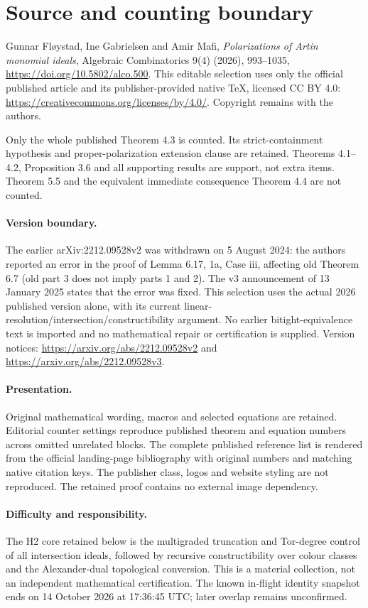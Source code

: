 \section*{Source and counting boundary}
Gunnar Fløystad, Ine Gabrielsen and Amir Mafi, \emph{Polarizations of Artin monomial ideals}, Algebraic Combinatorics 9(4) (2026), 993--1035, \url{https://doi.org/10.5802/alco.500}.
This editable selection uses only the official published article and its publisher-provided native TeX, licensed CC BY 4.0: \url{https://creativecommons.org/licenses/by/4.0/}. Copyright remains with the authors.

Only the whole published Theorem 4.3 is counted. Its strict-containment hypothesis and proper-polarization extension clause are retained. Theorems 4.1--4.2, Proposition 3.6 and all supporting results are support, not extra items. Theorem 5.5 and the equivalent immediate consequence Theorem 4.4 are not counted.

\paragraph{Version boundary.} The earlier arXiv:2212.09528v2 was withdrawn on 5 August 2024: the authors reported an error in the proof of Lemma 6.17, 1a, Case iii, affecting old Theorem 6.7 (old part 3 does not imply parts 1 and 2). The v3 announcement of 13 January 2025 states that the error was fixed. This selection uses the actual 2026 published version alone, with its current linear-resolution/intersection/constructibility argument. No earlier bitight-equivalence text is imported and no mathematical repair or certification is supplied. Version notices: \url{https://arxiv.org/abs/2212.09528v2} and \url{https://arxiv.org/abs/2212.09528v3}.

\paragraph{Presentation.} Original mathematical wording, macros and selected equations are retained. Editorial counter settings reproduce published theorem and equation numbers across omitted unrelated blocks. The complete published reference list is rendered from the official landing-page bibliography with original numbers and matching native citation keys. The publisher class, logos and website styling are not reproduced. The retained proof contains no external image dependency.

\paragraph{Difficulty and responsibility.} The H2 core retained below is the multigraded truncation and Tor-degree control of all intersection ideals, followed by recursive constructibility over colour classes and the Alexander-dual topological conversion. This is a material collection, not an independent mathematical certification. The known in-flight identity snapshot ends on 14 October 2026 at 17:36:45 UTC; later overlap remains unconfirmed.
